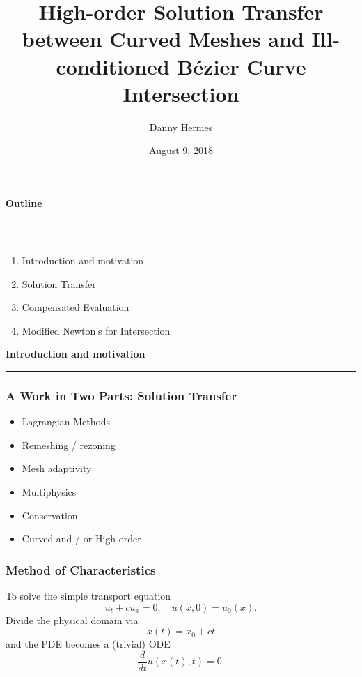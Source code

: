 \documentclass{beamer}
\title[Lagrange and B\'{e}zier]
  {High-order Solution Transfer between Curved Meshes and
  Ill-conditioned B\'{e}zier Curve Intersection}
\date{August 9, 2018}
\author{Danny Hermes}
\institute{{\lmss dhermes@berkeley.edu} \\
           UC Berkeley}
\begin{document}
\maketitle

\begin{frame}
\centering
{\Large\bf Outline} \\
\rule{0.82\textwidth}{1pt} \\[20pt]
\begin{minipage}{0.78\textwidth}\raggedright
\begin{enumerate}
\item Introduction and motivation
\item Solution Transfer
\item Compensated Evaluation
\item Modified Newton's for Intersection
\end{enumerate}
\end{minipage}
\end{frame}


\begin{frame}
\centering
{\Large \bf Introduction and motivation}
\rule{0.82\textwidth}{1pt}
\end{frame}

\begin{frame}
\frametitle{A Work in Two Parts: Solution Transfer}
\begin{itemize}
\item Lagrangian Methods
\item Remeshing / rezoning
\item Mesh adaptivity
\item Multiphysics
\item Conservation
\item Curved and / or High-order
\end{itemize}
\end{frame}

\begin{frame}
\frametitle{Method of Characteristics}
To solve the simple transport equation
\begin{equation*}
u_t + c u_x = 0, \quad u(x, 0) = u_0(x).
\end{equation*}
\pause
Divide the physical domain via
\begin{equation*}
x(t) = x_0 + ct
\end{equation*}
\pause
and the PDE becomes a (trivial) ODE
\begin{equation*}
\frac{d}{dt} u(x(t), t) = 0.
\end{equation*}
\end{frame}
\end{document}
